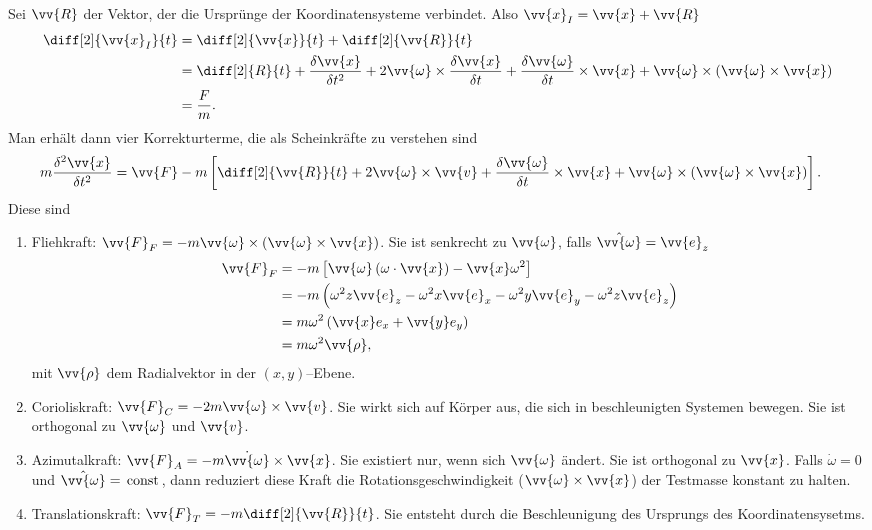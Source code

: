 \documentclass[a4paper,12pt]{article}
\numberwithin{equation}{section}
\begin{document}
Sei $\vv{R}$ der Vektor, der die Ursprünge der Koordinatensysteme verbindet. Also $\vv{x}_I=\vv{x}+\vv{R}$ 
\begin{align*}
        \diff[2]{\vv{x}_I}{t}&=\diff[2]{\vv{x}}{t}+\diff[2]{\vv{R}}{t}\\
                             &=\diff[2]{R}{t}+\dfrac{\delta \vv{x}}{\delta t^2}+2\vv{\omega }\times \dfrac{\delta \vv{x}}{\delta t}+\dfrac{\delta \vv{\omega }}{\delta t}\times \vv{x}+\vv{\omega }\times \left(\vv{\omega }\times \vv{x}\right)\\
                             &=\dfrac{F}{m}
.\end{align*}
Man erhält dann vier Korrekturterme, die als Scheinkräfte zu verstehen sind
\begin{align*}
        m\dfrac{\delta ^2\vv{x}}{\delta t^2}&=\vv{F}-m\left[\diff[2]{\vv{R}}{t}+2\vv{\omega }\times \vv{v}+\dfrac{\delta \vv{\omega }}{\delta t}\times \vv{x}+\vv{\omega }\times \left(\vv{\omega }\times \vv{x}\right)\right]
.\end{align*}
Diese sind
\begin{enumerate}[label=\alph*)]
        \item Fliehkraft: $\vv{F}_F=-m\vv{\omega }\times \left(\vv{\omega }\times \vv{x}\right)$. Sie ist senkrecht zu $\vv{\omega }$, falls $\hat{\vv{\omega }}=\vv{e}_z$
                \begin{align*}
                        \vv{F}_F&=-m\left[\vv{\omega }\left(\omega \cdot \vv{x}\right)-\vv{x}\omega ^2\right]\\
                                &=-m\left(\omega ^2z\vv{e}_z-\omega ^2x\vv{e}_x-\omega ^2y\vv{e}_y-\omega ^2z\vv{e}_z\right)\\
                                &=m\omega ^2\left(\vv{x}e_x+\vv{y}e_y\right)\\
                                &=m\omega ^2\vv{\rho }
                ,\end{align*}
                mit $\vv{\rho }$ dem Radialvektor in der $\left(x,y\right)$--Ebene.
        \item Corioliskraft: $\vv{F}_C=-2m\vv{\omega }\times \vv{v}$. Sie wirkt sich auf Körper aus, die sich in beschleunigten Systemen bewegen. Sie ist orthogonal zu $\vv{\omega }$ und $\vv{v}$.
        \item Azimutalkraft: $\vv{F}_A=-m\dot{\vv{\omega }}\times \vv{x}$. Sie existiert nur, wenn sich $\vv{\omega }$ ändert. Sie ist orthogonal zu $\vv{x}$. Falls $\dot{\omega }=0$ und $\hat{\vv{\omega }}=\,\text{const}\,$, dann reduziert diese Kraft die Rotationsgeschwindigkeit ($\vv{\omega }\times \vv{x}$) der Testmasse konstant zu halten.
        \item Translationskraft: $\vv{F}_T=-m\diff[2]{\vv{R}}{t}$. Sie entsteht durch die Beschleunigung des Ursprungs des Koordinatensysetms.
\end{enumerate}
\end{document}
